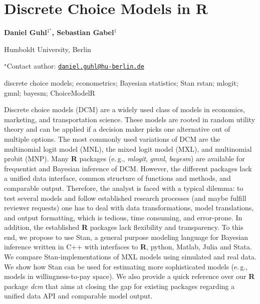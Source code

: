 \documentclass[\main/boa.tex]{subfiles}
\begin{document}
\section{Discrete Choice Models in R}

\begin{center}
  {\bf {} Daniel Guhl$^{1^\star}$,  Sebastian Gabel$^{1}$}
\end{center}

\vskip 0.3cm

\begin{affiliations}
\begin{enumerate}
\begin{minipage}{0.915\textwidth}
\centering
\item Humboldt University, Berlin \\[-2pt]
\end{minipage}
\end{enumerate}
$^\star$Contact author: \href{mailto:daniel.guhl@hu-berlin.de}{\nolinkurl{daniel.guhl@hu-berlin.de}}\\
\end{affiliations}

\vskip 0.5cm

\begin{minipage}{0.915\textwidth}
\keywords discrete choice models; econometrics; Bayesian statistics; Stan
\packages {} rstan;  mlogit;  gmnl;  bayesm;   ChoiceModelR
\end{minipage}

\vskip 0.8cm

Discrete choice models (DCM) are a widely used class of models in
economics, marketing, and transportation science. These models are
rooted in random utility theory and can be applied if a decision maker
picks one alternative out of multiple options. The most commonly used
variations of DCM are the multinomial logit model (MNL), the mixed logit
model (MXL), and multinomial probit (MNP). Many \textbf{R} packages
(e.\,g., \emph{mlogit}, \emph{gmnl}, \emph{bayesm}) are available for
frequentist and Bayesian inference of DCM. However, the different
packages lack a unified data interface, common structure of functions
and methods, and comparable output. Therefore, the analyst is faced with
a typical dilemma: to test several models and follow established
research processes (and maybe fulfill reviewer requests) one has to deal
with data transformations, model translations, and output formatting,
which is tedious, time consuming, and error-prone. In addition, the
established \textbf{R} packages lack flexibility and transparency. To
this end, we propose to use Stan, a general purpose modeling language
for Bayesian inference written in C++ with interfaces to \textbf{R},
python, Matlab, Julia and Stata. We compare Stan-implementations of 
MXL models using simulated and real data. We show how Stan can be
used for estimating more sophisticated models (e.\,g., models in
willingness-to-pay space). We also provide a quick reference over our
\textbf{R} package \emph{dcm} that aims at closing the gap for existing
packages regarding a unified data API and comparable model output.
\end{document}
